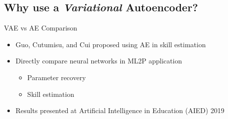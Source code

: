 \documentclass{beamer}
\theoremstyle{definition}
\begin{document}
\subsection{Why use a \textit{Variational} Autoencoder?}

\begin{frame}{VAE vs AE Comparison}
\begin{itemize}
  \item Guo, Cutumisu, and Cui proposed using AE in skill estimation
  \item Directly compare neural networks in ML2P application
  \begin{itemize}
    \item Parameter recovery
    \item Skill estimation
  \end{itemize}
  \item<2-> Results presented at Artificial Intelligence in Education (AIED) 2019
\end{itemize}
\end{frame}

\end{document}
